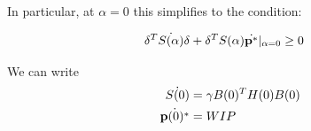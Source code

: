 In particular, at $\alpha=0$ this simplifies to the condition: 

\begin{align*}
    \delta^T \dot{S(\alpha)} \delta + \delta^T S(\alpha) \dot{\mathbf{p}^*} |_{\alpha=0} &\geq 0
\end{align*}


We can write 
\begin{align*}
    \dot{S(0)} &= \gamma B(0)^T H(0) B(0)\\
    \dot{\mathbf{p}(0)^*} &= WIP 
\end{align*}